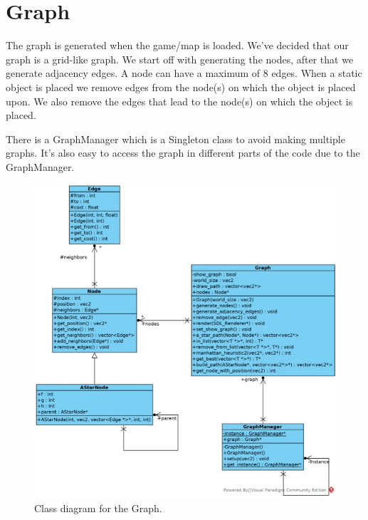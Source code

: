 \section{Graph}
The graph is generated when the game/map is loaded. We’ve decided that our graph is a grid-like graph. We start off with generating the nodes, after that we generate adjacency edges. A node can have a maximum of 8 edges. When a static object is placed we remove edges from the node(s) on which the object is placed upon. We also remove the edges that lead to the node(s) on which the object is placed.

There is a GraphManager which is a Singleton class to avoid making multiple graphs. It's also easy to access the graph in different parts of the code due to the GraphManager. 

\begin{figure}[H]
    \centering
    \includegraphics[scale=0.75]{res/graph.jpg}
    \caption{Class diagram for the Graph.}\label{fig:blue-line}
\end{figure}
